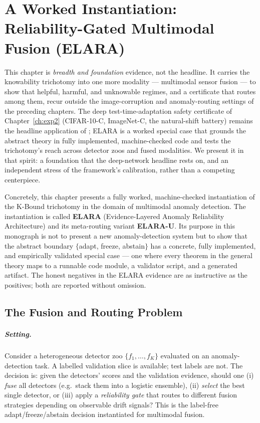 \chapter{A Worked Instantiation: Reliability-Gated Multimodal Fusion (ELARA)}\label{ch:elara}

This chapter is \emph{breadth and foundation} evidence, not the headline. It carries the
knowability trichotomy into one more modality --- multimodal sensor fusion --- to show
that helpful, harmful, and unknowable regimes, and a certificate that routes among them,
recur outside the image-corruption and anomaly-routing settings of the preceding
chapters. The deep test-time-adaptation safety certificate of Chapter~\ref{ch:exp2}
(CIFAR-10-C, ImageNet-C, the natural-shift battery) remains the headline application of
\KBound; ELARA is a worked special case that grounds the abstract theory in fully
implemented, machine-checked code and tests the trichotomy's reach across detector zoos
and fused modalities. We present it in that spirit: a foundation that the deep-network
headline rests on, and an independent stress of the framework's calibration, rather than
a competing centerpiece.

Concretely, this chapter presents a fully worked, machine-checked instantiation of the
K-Bound trichotomy in the domain of multimodal anomaly detection.  The instantiation is
called \textbf{ELARA} (Evidence-Layered Anomaly Reliability Architecture) and its
meta-routing variant \textbf{ELARA-U}.  Its purpose in this monograph is not to present a
new anomaly-detection system but to show that the abstract boundary $\{$adapt, freeze,
abstain$\}$ has a concrete, fully implemented, and empirically validated special case ---
one where every theorem in the general theory maps to a runnable code module, a validator
script, and a generated artifact.  The honest negatives in the ELARA evidence are as
instructive as the positives; both are reported without omission.

\section{The Fusion and Routing Problem}\label{sec:elara-problem}

\paragraph{Setting.}
Consider a heterogeneous detector zoo $\{f_1, \ldots, f_K\}$ evaluated on an
anomaly-detection task.  A labelled validation slice is available; test labels are
not.  The decision is: given the detectors' scores and the validation evidence,
should one (i) \emph{fuse} all detectors (e.g.\ stack them into a logistic ensemble),
(ii) \emph{select} the best single detector, or (iii) apply a \emph{reliability
gate} that routes to different fusion strategies depending on observable drift
signals?  This is the label-free adapt/freeze/abstain decision instantiated for
multimodal fusion.

